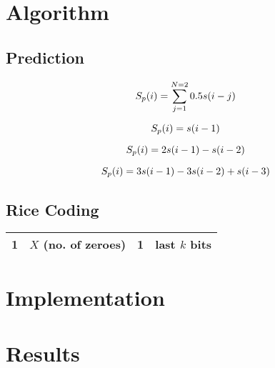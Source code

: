 \documentclass{article}
\begin{document}
\section*{Algorithm}

\subsection*{Prediction}

\cite{makhoul1975linear}
\begin{equation}
S_p(i) = \sum_{j=1}^{N=2} 0.5s(i-j) \\
\end{equation}

\begin{equation}
S_p(i) = s(i-1) \\
\end{equation}

\begin{equation}
S_p(i) = 2s(i-1) - s(i-2) \\
\end{equation}

\begin{equation}
S_p(i) = 3s(i-1) - 3s(i-2) + s(i-3) \\
\end{equation}

\subsection*{Rice Coding}

\begin{center}
\begin{tabular}{|r|c|c|l|}
  \hline
  \textbf{1} & $X$ (no. of zeroes) & \textbf{1} & last $k$ bits \\
  \hline
\end{tabular}
\end{center}

\section*{Implementation}

\section*{Results}
\end{document}
